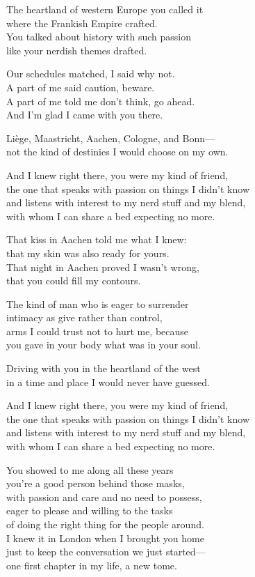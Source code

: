 \begin{lyrics}
The heartland of western Europe you called it\\
where the Frankish Empire crafted.\\
You talked about history with such passion\\
like your nerdish themes drafted.

Our schedules matched, I said why not.\\
A part of me said caution, beware.\\
A part of me told me don’t think, go ahead.\\
And I’m glad I came with you there.

Liège, Maastricht, Aachen, Cologne, and Bonn—\\
not the kind of destinies I would choose on my own.

And I knew right there, you were my kind of friend,\\
the one that speaks with passion on things I didn’t know\\
and listens with interest to my nerd stuff and my blend,\\
with whom I can share a bed expecting no more.

That kiss in Aachen told me what I knew:\\
that my skin was also ready for yours.\\
That night in Aachen proved I wasn’t wrong,\\
that you could fill my contours.

The kind of man who is eager to surrender\\
intimacy as give rather than control,\\
arms I could trust not to hurt me, because\\
you gave in your body what was in your soul.

Driving with you in the heartland of the west\\
in a time and place I would never have guessed.

And I knew right there, you were my kind of friend,\\
the one that speaks with passion on things I didn’t know\\
and listens with interest to my nerd stuff and my blend,\\
with whom I can share a bed expecting no more.

You showed to me along all these years\\
you’re a good person behind those masks,\\
with passion and care and no need to possess,\\
eager to please and willing to the tasks\\
of doing the right thing for the people around.\\
I knew it in London when I brought you home\\
just to keep the conversation we just started—\\
one first chapter in my life, a new tome.


\end{lyrics}
